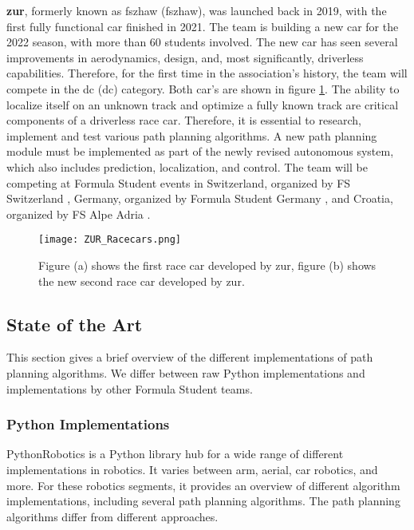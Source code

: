 \textbf{\acrlong{zur}}, formerly known as \acrlong{fszhaw} (\acrshort{fszhaw}), was launched back in 2019, with the first fully functional car finished in 2021. The team is building a new car for the 2022 season, with more than 60 students involved. The new car has seen several improvements in aerodynamics, design, and, most significantly, driverless capabilities. \cite{fszhaw_launch}
Therefore, for the first time in the association's history, the team will compete in the \acrlong{dc} (\acrshort{dc}) category. Both car's are shown in figure \ref{fig:ZUR Racecars}.
The ability to localize itself on an unknown track and optimize a fully known track are critical components of a driverless race car. Therefore, it is essential to research, implement and test various path planning algorithms. A new path planning module must be implemented as part of the newly revised autonomous system, which also includes prediction, localization, and control.
The team will be competing at Formula Student events in Switzerland, organized by FS Switzerland \cite{fsswitzerland}, Germany, organized by Formula Student Germany \cite{fs_germany}, and Croatia, organized by FS Alpe Adria \cite{fs_alpe_adria}.
\begin{figure}[H]
    \centering
    \texttt{[image: ZUR\_Racecars.png]}
    \caption{Figure (a) shows the first race car developed by \acrshort{zur}, figure (b) shows the new second race car developed by \acrshort{zur}.}
    \label{fig:ZUR Racecars}
\end{figure}

\subsection{State of the Art} \label{sec:State of the Art}
This section gives a brief overview of the different implementations of path planning algorithms. We differ between raw Python implementations and implementations by other Formula Student teams.

\subsubsection{Python Implementations} \label{sec:Python Implementations}
PythonRobotics is a Python library hub for a wide range of different implementations in robotics. It varies between arm, aerial, car robotics, and more.
For these robotics segments, it provides an overview of different algorithm implementations, including several path planning algorithms.
The path planning algorithms differ from different approaches.
\cite{python_robotics}

